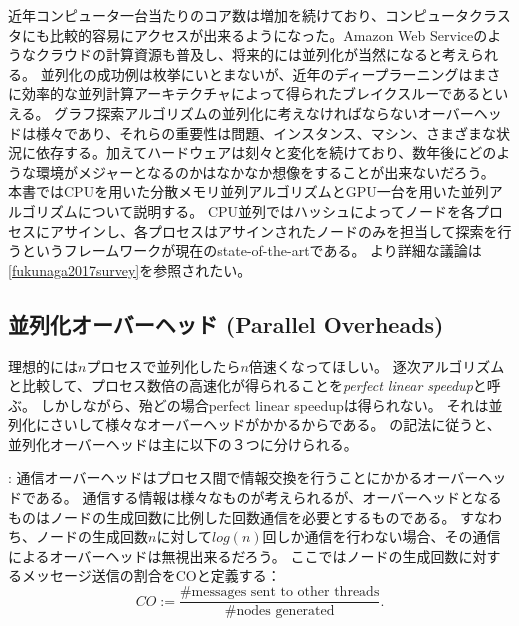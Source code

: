 近年コンピュータ一台当たりのコア数は増加を続けており、コンピュータクラスタにも比較的容易にアクセスが出来るようになった。Amazon Web Serviceのようなクラウドの計算資源も普及し、将来的には並列化が当然になると考えられる。
並列化の成功例は枚挙にいとまないが、近年のディープラーニングはまさに効率的な並列計算アーキテクチャによって得られたブレイクスルーであるといえる。
グラフ探索アルゴリズムの並列化に考えなければならないオーバーヘッドは様々であり、それらの重要性は問題、インスタンス、マシン、さまざまな状況に依存する。加えてハードウェアは刻々と変化を続けており、数年後にどのような環境がメジャーとなるのかはなかなか想像をすることが出来ないだろう。
本書ではCPUを用いた分散メモリ並列アルゴリズムとGPU一台を用いた並列アルゴリズムについて説明する。
CPU並列ではハッシュによってノードを各プロセスにアサインし、各プロセスはアサインされたノードのみを担当して探索を行うというフレームワークが現在のstate-of-the-artである。
より詳細な議論は\ref{fukunaga2017survey}を参照されたい。

\subsection{並列化オーバーヘッド (Parallel Overheads)}
\label{sec:parallel-overheads}

理想的には$n$プロセスで並列化したら$n$倍速くなってほしい。
逐次アルゴリズムと比較して、プロセス数倍の高速化が得られることを{\it perfect linear speedup}と呼ぶ。
しかしながら、殆どの場合perfect linear speedupは得られない。
それは並列化にさいして様々なオーバーヘッドがかかるからである。
\cite{jinnai2017work}の記法に従うと、並列化オーバーヘッドは主に以下の３つに分けられる。

:
通信オーバーヘッドはプロセス間で情報交換を行うことにかかるオーバーヘッドである。
通信する情報は様々なものが考えられるが、オーバーヘッドとなるものはノードの生成回数に比例した回数通信を必要とするものである。
すなわち、ノードの生成回数$n$に対して$log(n)$回しか通信を行わない場合、その通信によるオーバーヘッドは無視出来るだろう。
ここではノードの生成回数に対するメッセージ送信の割合をCOと定義する：
\begin{equation}
	CO := \frac{\text{\# messages sent to other threads}}{\text{\# nodes generated}}.
\end{equation}

